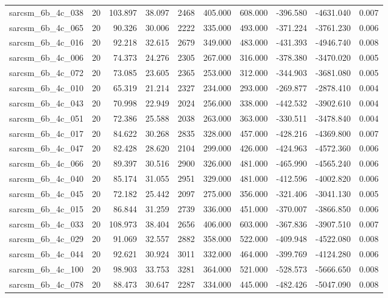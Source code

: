 \begin{tabular}{lrrrrrrrrr}
sarcsm\_6b\_4c\_038 & 20 & 103.897 & 38.097 & 2468 & 405.000 & 608.000 & -396.580 & -4631.040 & 0.007 \\
sarcsm\_6b\_4c\_065 & 20 & 90.326 & 30.006 & 2222 & 335.000 & 493.000 & -371.224 & -3761.230 & 0.006 \\
sarcsm\_6b\_4c\_016 & 20 & 92.218 & 32.615 & 2679 & 349.000 & 483.000 & -431.393 & -4946.740 & 0.008 \\
sarcsm\_6b\_4c\_006 & 20 & 74.373 & 24.276 & 2305 & 267.000 & 316.000 & -378.380 & -3470.020 & 0.005 \\
sarcsm\_6b\_4c\_072 & 20 & 73.085 & 23.605 & 2365 & 253.000 & 312.000 & -344.903 & -3681.080 & 0.005 \\
sarcsm\_6b\_4c\_010 & 20 & 65.319 & 21.214 & 2327 & 234.000 & 293.000 & -269.877 & -2878.410 & 0.004 \\
sarcsm\_6b\_4c\_043 & 20 & 70.998 & 22.949 & 2024 & 256.000 & 338.000 & -442.532 & -3902.610 & 0.004 \\
sarcsm\_6b\_4c\_051 & 20 & 72.386 & 25.588 & 2038 & 263.000 & 363.000 & -330.511 & -3478.840 & 0.004 \\
sarcsm\_6b\_4c\_017 & 20 & 84.622 & 30.268 & 2835 & 328.000 & 457.000 & -428.216 & -4369.800 & 0.007 \\
sarcsm\_6b\_4c\_047 & 20 & 82.428 & 28.620 & 2104 & 299.000 & 426.000 & -424.963 & -4572.360 & 0.006 \\
sarcsm\_6b\_4c\_066 & 20 & 89.397 & 30.516 & 2900 & 326.000 & 481.000 & -465.990 & -4565.240 & 0.006 \\
sarcsm\_6b\_4c\_040 & 20 & 85.174 & 31.055 & 2951 & 329.000 & 481.000 & -412.596 & -4002.820 & 0.006 \\
sarcsm\_6b\_4c\_045 & 20 & 72.182 & 25.442 & 2097 & 275.000 & 356.000 & -321.406 & -3041.130 & 0.005 \\
sarcsm\_6b\_4c\_015 & 20 & 86.844 & 31.259 & 2739 & 336.000 & 451.000 & -370.007 & -3866.850 & 0.006 \\
sarcsm\_6b\_4c\_033 & 20 & 108.973 & 38.404 & 2656 & 406.000 & 603.000 & -367.836 & -3907.510 & 0.007 \\
sarcsm\_6b\_4c\_029 & 20 & 91.069 & 32.557 & 2882 & 358.000 & 522.000 & -409.948 & -4522.080 & 0.008 \\
sarcsm\_6b\_4c\_044 & 20 & 92.621 & 30.924 & 3011 & 332.000 & 464.000 & -399.769 & -4124.280 & 0.006 \\
sarcsm\_6b\_4c\_100 & 20 & 98.903 & 33.753 & 3281 & 364.000 & 521.000 & -528.573 & -5666.650 & 0.008 \\
sarcsm\_6b\_4c\_078 & 20 & 88.473 & 30.647 & 2287 & 334.000 & 445.000 & -482.426 & -5047.090 & 0.008 \\

\end{tabular}
